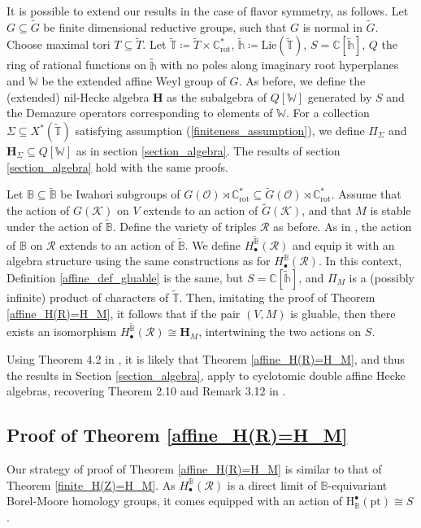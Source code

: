 \documentclass[11pt]{article}
\newcommand{\C}{\mathbb{C}}
\renewcommand{\O}{\mathcal{O}}
\newcommand{\K}{\mathcal{K}}
\newcommand{\R}{\mathcal{R}}
\renewcommand{\H}{\textbf{H}}
\newcommand{\bbB}{\mathbb{B}}
\newcommand{\1}{\mathbb{1}}
\renewcommand{\th}{\mathbb{h}}
\newcommand{\bbh}{\mathbb{h}}
\newcommand{\tW}{\mathbb{W}}
\newcommand{\tT}{\mathbb{T}}
\newcommand{\HBM}[2]{H_\bullet^{#1}(#2)}
\newcommand{\Crot}{\C^*_{\text{rot}}}
\newcommand{\pt}{\text{pt}}
\renewcommand{\subset}{\subseteq}
\theoremstyle{definition}
\numberwithin{equation}{section}
\begin{document}
It is possible to extend our results in the case of flavor symmetry, as follows. Let $G\subset \widetilde{G}$ be finite dimensional reductive groups, such that $G$ is normal in $\widetilde{G}$. Choose maximal tori $T \subset \widetilde{T}$. Let $\widetilde{\tT}\coloneqq \widetilde{T}\times \Crot$, $\widetilde{\th} \coloneqq \text{Lie}(\widetilde{\tT})$, $S=\C[\widetilde{\th}]$, $Q$ the ring of rational functions on $\widetilde{
\th}$ with no poles along imaginary root hyperplanes and $\tW$ be the extended affine Weyl group of $G$. As before, we define the (extended) nil-Hecke algebra $\H$ as the subalgebra of $Q[\tW]$ generated by $S$ and the Demazure operators corresponding to elements of $\tW$. For a collection $\Sigma \subset X^*(\widetilde{\tT})$ satisfying assumption (\ref{finiteness_assumption}), we define $\Pi_\Sigma$ and $\H_\Sigma \subset Q[\tW]$ as in section \ref{section_algebra}. The results of section \ref{section_algebra} hold with the same proofs.

Let $\bbB\subset \widetilde{\bbB}$ be Iwahori subgroups of $G(\O)\rtimes \Crot \subset \widetilde{G}(\O) \rtimes \Crot$. Assume that the action of $G(\K)$ on $V$ extends to an action of $\widetilde{G}(\K)$, and that $M$ is stable under the action of $\widetilde{\bbB}$. Define the variety of triples $\R$ as before. As in \cite[3(viii)]{BFN}, the action of $\bbB$ on $\R$ extends to an action of $\widetilde{\bbB}$. We define $\HBM{\widetilde{\bbB}}{\R}$ and equip it with an algebra structure using the same constructions as for $\HBM{{\bbB}}{\R}$. In this context, Definition \ref{affine_def_gluable} is the same, but $S=\C[\widetilde{\bbh}]$, and $\Pi_M$ is a (possibly infinite) product of characters of $\widetilde{\tT}$. Then, imitating the proof of Theorem \ref{affine_H(R)=H_M}, it follows that if the pair $(V,M)$ is gluable, then there exists an isomorphism $\HBM{\widetilde{\bbB}}{\R} \cong \H_M$, intertwining the two actions on $S$.

Using Theorem 4.2 in \cite{BEF}, it is likely that Theorem \ref{affine_H(R)=H_M}, and thus the results in Section \ref{section_algebra}, apply to cyclotomic double affine Hecke algebras, recovering Theorem 2.10 and Remark 3.12 in \cite{BEF}.


\subsection*{Proof of Theorem \ref{affine_H(R)=H_M}}

Our strategy of proof of Theorem \ref{affine_H(R)=H_M} is similar to that of Theorem \ref{finite_H(Z)=H_M}. As $\HBM{\bbB}{\R}$ is a direct limit of $\bbB$-equivariant Borel-Moore homology groups, it comes equipped with an action of $\text{H}^\bullet_\bbB(\pt) \cong S$. 
\end{document}
